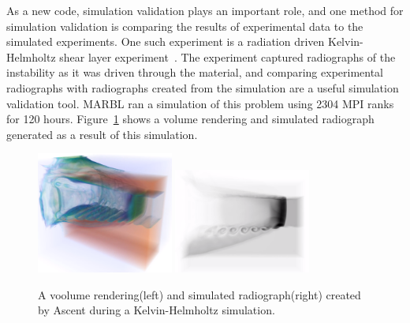 As a new code, simulation validation plays an important role, and one method
for simulation validation is comparing the results of experimental data to the
simulated experiments.
%
One such experiment is a radiation driven Kelvin-Helmholtz shear
layer experiment~\cite{hurricane2009high}.
%
The experiment captured radiographs of the instability as it was driven through
the material, and comparing experimental radiographs with radiographs created from
the simulation are a useful simulation validation tool.
%
MARBL ran a simulation of this problem using 2304 MPI ranks for 120 hours.
%
Figure~\ref{img:radkh} shows a volume rendering and simulated radiograph
generated as a result of this simulation.
%
\begin{figure}
\centering
\includegraphics[width=0.4\textwidth]{images/radkh}
\includegraphics[width=0.4\textwidth]{images/radkh_xray}
  \caption{\label{img:radkh}A voolume rendering(left) and simulated radiograph(right) created by
Ascent during a Kelvin-Helmholtz simulation.}
\end{figure}

%



